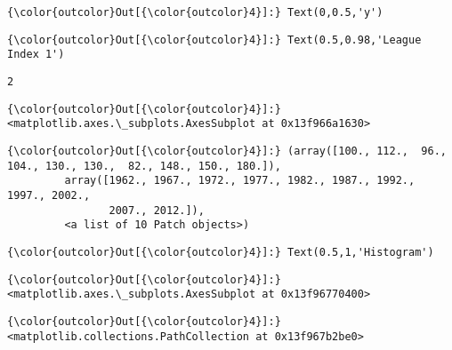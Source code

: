 \documentclass[11pt]{article}
\begin{document}
\begin{Verbatim}[commandchars=\\\{\}]
{\color{outcolor}Out[{\color{outcolor}4}]:} Text(0,0.5,'y')
\end{Verbatim}
            
\begin{Verbatim}[commandchars=\\\{\}]
{\color{outcolor}Out[{\color{outcolor}4}]:} Text(0.5,0.98,'League Index 1')
\end{Verbatim}
            
    \begin{Verbatim}[commandchars=\\\{\}]
2

    \end{Verbatim}

\begin{Verbatim}[commandchars=\\\{\}]
{\color{outcolor}Out[{\color{outcolor}4}]:} <matplotlib.axes.\_subplots.AxesSubplot at 0x13f966a1630>
\end{Verbatim}
            
\begin{Verbatim}[commandchars=\\\{\}]
{\color{outcolor}Out[{\color{outcolor}4}]:} (array([100., 112.,  96., 104., 130., 130.,  82., 148., 150., 180.]),
         array([1962., 1967., 1972., 1977., 1982., 1987., 1992., 1997., 2002.,
                2007., 2012.]),
         <a list of 10 Patch objects>)
\end{Verbatim}
            
\begin{Verbatim}[commandchars=\\\{\}]
{\color{outcolor}Out[{\color{outcolor}4}]:} Text(0.5,1,'Histogram')
\end{Verbatim}
            
\begin{Verbatim}[commandchars=\\\{\}]
{\color{outcolor}Out[{\color{outcolor}4}]:} <matplotlib.axes.\_subplots.AxesSubplot at 0x13f96770400>
\end{Verbatim}
            
\begin{Verbatim}[commandchars=\\\{\}]
{\color{outcolor}Out[{\color{outcolor}4}]:} <matplotlib.collections.PathCollection at 0x13f967b2be0>
\end{Verbatim}
            
\end{document}
